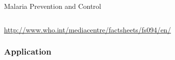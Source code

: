 \documentclass[10pt,usenames,dvipsnames]{beamer}
\begin{document}
\begin{frame}{Malaria Prevention and Control}
\begin{tabular}{ccc}
      \end{tabular}
      
      \url{http://www.who.int/mediacentre/factsheets/fs094/en/}



%
%
%



\end{frame}

\subsubsection{Application}
\end{document}
